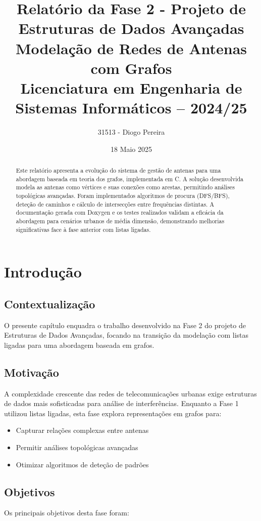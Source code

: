 \documentclass[a4paper,12pt]{report}
\title{%
  \textbf{Relatório da Fase 2 - Projeto de Estruturas de Dados Avançadas}\\[2em]
  \large Modelação de Redes de Antenas com Grafos\\[2em]
  Licenciatura em Engenharia de Sistemas Informáticos -- 2024/25
}
\author{31513 - Diogo Pereira}
\date{18 Maio 2025}
\begin{document}
\maketitle

\begin{abstract}
Este relatório apresenta a evolução do sistema de gestão de antenas para uma abordagem baseada em teoria dos grafos, implementada em C. A solução desenvolvida modela as antenas como vértices e suas conexões como arestas, permitindo análises topológicas avançadas. Foram implementados algoritmos de procura (DFS/BFS), deteção de caminhos e cálculo de intersecções entre frequências distintas. A documentação gerada com Doxygen e os testes realizados validam a eficácia da abordagem para cenários urbanos de média dimensão, demonstrando melhorias significativas face à fase anterior com listas ligadas.
\end{abstract}

\tableofcontents

\chapter{Introdução}
\section{Contextualização}
O presente capítulo enquadra o trabalho desenvolvido na Fase 2 do projeto de Estruturas de Dados Avançadas, focando na transição da modelação com listas ligadas para uma abordagem baseada em grafos.

\section{Motivação}
A complexidade crescente das redes de telecomunicações urbanas exige estruturas de dados mais sofisticadas para análise de interferências. Enquanto a Fase 1 utilizou listas ligadas, esta fase explora representações em grafos para:

\begin{itemize}
    \item Capturar relações complexas entre antenas
    \item Permitir análises topológicas avançadas
    \item Otimizar algoritmos de deteção de padrões
\end{itemize}

\section{Objetivos}
Os principais objetivos desta fase foram:
\end{document}
